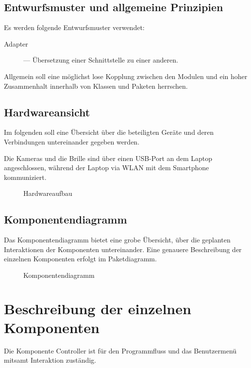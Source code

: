 \subsection{Entwurfsmuster und allgemeine Prinzipien}
Es werden folgende Entwurfsmuster verwendet:
\begin{description}
	\item [Adapter] --- Übersetzung einer Schnittstelle zu einer anderen.
\end{description}

Allgemein soll eine möglichst lose Kopplung zwischen den Modulen und ein hoher Zusammenhalt innerhalb von Klassen und Paketen herrschen.

\subsection{Hardwareansicht}
Im folgenden soll eine Übersicht über die beteiligten Geräte und deren Verbindungen untereinander gegeben werden.

Die Kameras und die Brille sind über einen USB-Port an dem Laptop angeschlossen, während der Laptop via WLAN mit dem Smartphone kommuniziert.
\begin{figure}[H]
		\centering
		\caption{Hardwareaufbau}
		\label{fig:entwurf_hardware}
\end{figure}

\subsection{Komponentendiagramm}
Das Komponentendiagramm bietet eine grobe Übersicht, über die geplanten Interaktionen der Komponenten untereinander.
Eine genauere Beschreibung der einzelnen Komponenten erfolgt im Paketdiagramm.
\begin{figure}[H]
	\centering
	\caption{Komponentendiagramm}
	\label{fig:entwurf_komponenten}
\end{figure}

\section{Beschreibung der einzelnen Komponenten}
Die Komponente Controller ist für den Programmfluss und das Benutzermenü mitsamt Interaktion zuständig.

